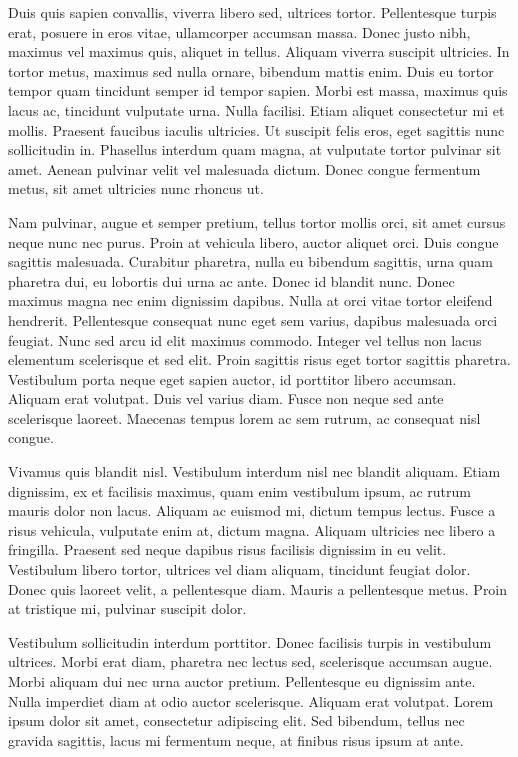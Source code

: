 Duis quis sapien convallis, viverra libero sed, ultrices tortor. Pellentesque turpis erat, posuere in eros vitae, ullamcorper accumsan massa. Donec justo nibh, maximus vel maximus quis, aliquet in tellus. Aliquam viverra suscipit ultricies. In tortor metus, maximus sed nulla ornare, bibendum mattis enim. Duis eu tortor tempor quam tincidunt semper id tempor sapien. Morbi est massa, maximus quis lacus ac, tincidunt vulputate urna. Nulla facilisi. Etiam aliquet consectetur mi et mollis. Praesent faucibus iaculis ultricies. Ut suscipit felis eros, eget sagittis nunc sollicitudin in. Phasellus interdum quam magna, at vulputate tortor pulvinar sit amet. Aenean pulvinar velit vel malesuada dictum. Donec congue fermentum metus, sit amet ultricies nunc rhoncus ut.

Nam pulvinar, augue et semper pretium, tellus tortor mollis orci, sit amet cursus neque nunc nec purus. Proin at vehicula libero, auctor aliquet orci. Duis congue sagittis malesuada. Curabitur pharetra, nulla eu bibendum sagittis, urna quam pharetra dui, eu lobortis dui urna ac ante. Donec id blandit nunc. Donec maximus magna nec enim dignissim dapibus. Nulla at orci vitae tortor eleifend hendrerit. Pellentesque consequat nunc eget sem varius, dapibus malesuada orci feugiat. Nunc sed arcu id elit maximus commodo. Integer vel tellus non lacus elementum scelerisque et sed elit. Proin sagittis risus eget tortor sagittis pharetra. Vestibulum porta neque eget sapien auctor, id porttitor libero accumsan. Aliquam erat volutpat. Duis vel varius diam. Fusce non neque sed ante scelerisque laoreet. Maecenas tempus lorem ac sem rutrum, ac consequat nisl congue.

Vivamus quis blandit nisl. Vestibulum interdum nisl nec blandit aliquam. Etiam dignissim, ex et facilisis maximus, quam enim vestibulum ipsum, ac rutrum mauris dolor non lacus. Aliquam ac euismod mi, dictum tempus lectus. Fusce a risus vehicula, vulputate enim at, dictum magna. Aliquam ultricies nec libero a fringilla. Praesent sed neque dapibus risus facilisis dignissim in eu velit. Vestibulum libero tortor, ultrices vel diam aliquam, tincidunt feugiat dolor. Donec quis laoreet velit, a pellentesque diam. Mauris a pellentesque metus. Proin at tristique mi, pulvinar suscipit dolor.

Vestibulum sollicitudin interdum porttitor. Donec facilisis turpis in vestibulum ultrices. Morbi erat diam, pharetra nec lectus sed, scelerisque accumsan augue. Morbi aliquam dui nec urna auctor pretium. Pellentesque eu dignissim ante. Nulla imperdiet diam at odio auctor scelerisque. Aliquam erat volutpat. Lorem ipsum dolor sit amet, consectetur adipiscing elit. Sed bibendum, tellus nec gravida sagittis, lacus mi fermentum neque, at finibus risus ipsum at ante.

